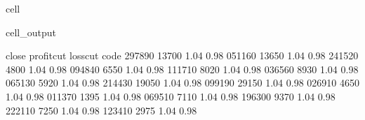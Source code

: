 \documentclass[letterpaper,10pt,english]{jupyterBook}
\begin{document}
\begin{sphinxuseclass}{cell}
\begin{sphinxVerbatimOutput}
\begin{sphinxuseclass}{cell_output}
\begin{sphinxVerbatim}[commandchars=\\\{\}]
        close  profit\PYGZus{}cut  loss\PYGZus{}cut  
code                                 
297890  13700        1.04      0.98  
051160  13650        1.04      0.98  
241520   4800        1.04      0.98  
094840   6550        1.04      0.98  
111710   8020        1.04      0.98  
036560   8930        1.04      0.98  
065130   5920        1.04      0.98  
214430  19050        1.04      0.98  
099190  29150        1.04      0.98  
026910   4650        1.04      0.98  
011370   1395        1.04      0.98  
069510   7110        1.04      0.98  
196300   9370        1.04      0.98  
222110   7250        1.04      0.98  
123410   2975        1.04      0.98  
\end{sphinxVerbatim}

\end{sphinxuseclass}\end{sphinxVerbatimOutput}

\end{sphinxuseclass}
\end{document}
